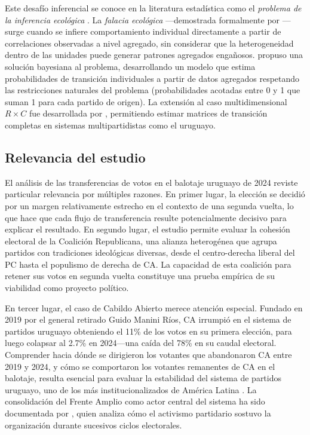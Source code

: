 Este desafío inferencial se conoce en la literatura estadística como el \textit{problema de la inferencia ecológica} \citep{king1997}. La \textit{falacia ecológica} ---demostrada formalmente por \citet{robinson1950ecological}--- surge cuando se infiere comportamiento individual directamente a partir de correlaciones observadas a nivel agregado, sin considerar que la heterogeneidad dentro de las unidades puede generar patrones agregados engañosos. \citet{king1997} propuso una solución bayesiana al problema, desarrollando un modelo que estima probabilidades de transición individuales a partir de datos agregados respetando las restricciones naturales del problema (probabilidades acotadas entre 0 y 1 que suman 1 para cada partido de origen). La extensión al caso multidimensional $R \times C$ fue desarrollada por \citet{rosen2001bayesian}, permitiendo estimar matrices de transición completas en sistemas multipartidistas como el uruguayo.

\subsection{Relevancia del estudio}

El análisis de las transferencias de votos en el balotaje uruguayo de 2024 reviste particular relevancia por múltiples razones. En primer lugar, la elección se decidió por un margen relativamente estrecho en el contexto de una segunda vuelta, lo que hace que cada flujo de transferencia resulte potencialmente decisivo para explicar el resultado. En segundo lugar, el estudio permite evaluar la cohesión electoral de la Coalición Republicana, una alianza heterogénea que agrupa partidos con tradiciones ideológicas diversas, desde el centro-derecha liberal del PC hasta el populismo de derecha de CA. La capacidad de esta coalición para retener sus votos en segunda vuelta constituye una prueba empírica de su viabilidad como proyecto político.

En tercer lugar, el caso de Cabildo Abierto merece atención especial. Fundado en 2019 por el general retirado Guido Manini Ríos, CA irrumpió en el sistema de partidos uruguayo obteniendo el 11\% de los votos en su primera elección, para luego colapsar al 2.7\% en 2024---una caída del 78\% en su caudal electoral. Comprender hacia dónde se dirigieron los votantes que abandonaron CA entre 2019 y 2024, y cómo se comportaron los votantes remanentes de CA en el balotaje, resulta esencial para evaluar la estabilidad del sistema de partidos uruguayo, uno de los más institucionalizados de América Latina \citep{mainwaring1995party, sartori1976parties}. La consolidación del Frente Amplio como actor central del sistema ha sido documentada por \citet{perezbentancur2019frente}, quien analiza cómo el activismo partidario sostuvo la organización durante sucesivos ciclos electorales.


